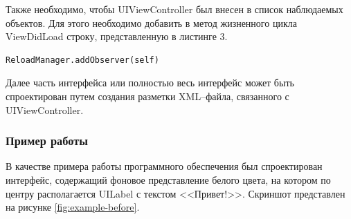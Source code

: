 Также необходимо, чтобы UIViewController был внесен в список наблюдаемых объектов. Для этого необходимо добавить в метод жизненного цикла ViewDidLoad строку, представленную в листинге 3.

\begin{lstlisting}[caption={Внесение UIViewController в список наблюдаемых объектов}]
ReloadManager.addObserver(self)
\end{lstlisting}

Далее часть интерфейса или полностью весь интерфейс может быть спроектирован путем создания разметки XML--файла, связанного с UIViewController.

\subsubsection{Пример работы}

В качестве примера работы программного обеспечения был спроектирован интерфейс, содержащий фоновое представление белого цвета, на котором по центру располагается UILabel с текстом <<Привет!>>. 
Скриншот представлен на рисунке \ref{fig:example-before}.


